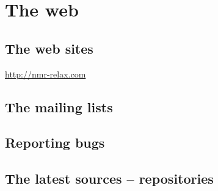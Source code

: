 
\chapter{The web}



\section{The web sites}

\href{http://nmr-relax.com}{http://nmr-relax.com}



\section{The mailing lists}



\section{Reporting bugs}



\section{The latest sources -- repositories}
